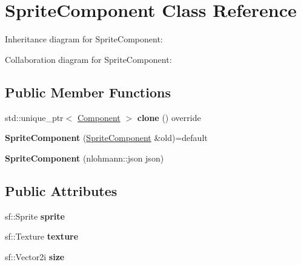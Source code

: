 \hypertarget{classSpriteComponent}{\section{Sprite\-Component Class Reference}
\label{classSpriteComponent}
}


Inheritance diagram for Sprite\-Component\-:


Collaboration diagram for Sprite\-Component\-:
\subsection*{Public Member Functions}
\begin{DoxyCompactItemize}
\item 
\hypertarget{classSpriteComponent_a9f3d289105de1bfd5679b1f0095f2a37}{std\-::unique\-\_\-ptr$<$ \hyperlink{classComponent}{Component} $>$ {\bfseries clone} () override}\label{classSpriteComponent_a9f3d289105de1bfd5679b1f0095f2a37}

\item 
\hypertarget{classSpriteComponent_ad0ee9b504468905b0232f53c87a0d5dc}{{\bfseries Sprite\-Component} (\hyperlink{classSpriteComponent}{Sprite\-Component} \&old)=default}\label{classSpriteComponent_ad0ee9b504468905b0232f53c87a0d5dc}

\item 
\hypertarget{classSpriteComponent_a108d41a569c938928920886ac205785d}{{\bfseries Sprite\-Component} (nlohmann\-::json json)}\label{classSpriteComponent_a108d41a569c938928920886ac205785d}

\end{DoxyCompactItemize}
\subsection*{Public Attributes}
\begin{DoxyCompactItemize}
\item 
\hypertarget{classSpriteComponent_ac49ac20d7050d549b853b97c43790164}{sf\-::\-Sprite {\bfseries sprite}}\label{classSpriteComponent_ac49ac20d7050d549b853b97c43790164}

\item 
\hypertarget{classSpriteComponent_a60a5b6b5e855d1cc9ed87d4ea1762f99}{sf\-::\-Texture {\bfseries texture}}\label{classSpriteComponent_a60a5b6b5e855d1cc9ed87d4ea1762f99}

\item 
\hypertarget{classSpriteComponent_a12da3a2d88705372ca6adfe18f26fbda}{sf\-::\-Vector2i {\bfseries size}}\label{classSpriteComponent_a12da3a2d88705372ca6adfe18f26fbda}

\end{DoxyCompactItemize}
